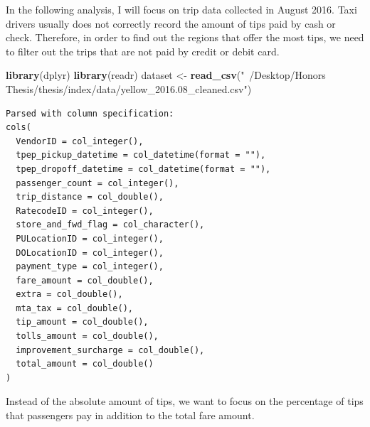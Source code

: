 \documentclass[12pt,twoside]{reedthesis}
\newenvironment{Shaded}{\begin{snugshade}}{\end{snugshade}}
\newcommand{\KeywordTok}[1]{\textcolor[rgb]{0.13,0.29,0.53}{\textbf{#1}}}
\newcommand{\DataTypeTok}[1]{\textcolor[rgb]{0.13,0.29,0.53}{#1}}
\newcommand{\DecValTok}[1]{\textcolor[rgb]{0.00,0.00,0.81}{#1}}
\newcommand{\FloatTok}[1]{\textcolor[rgb]{0.00,0.00,0.81}{#1}}
\newcommand{\StringTok}[1]{\textcolor[rgb]{0.31,0.60,0.02}{#1}}
\newcommand{\OperatorTok}[1]{\textcolor[rgb]{0.81,0.36,0.00}{\textbf{#1}}}
\newcommand{\NormalTok}[1]{#1}
\theoremstyle{definition}
\theoremstyle{definition}
\theoremstyle{definition}
\theoremstyle{remark}
\begin{document}
In the following analysis, I will focus on trip data collected in August
2016. Taxi drivers usually does not correctly record the amount of tips
paid by cash or check. Therefore, in order to find out the regions that
offer the most tips, we need to filter out the trips that are not paid
by credit or debit card.
\begin{Shaded}
\begin{Highlighting}[]
\KeywordTok{library}\NormalTok{(dplyr)}
\KeywordTok{library}\NormalTok{(readr)}
\NormalTok{dataset <-}\StringTok{ }\KeywordTok{read_csv}\NormalTok{(}\StringTok{"~/Desktop/Honors Thesis/thesis/index/data/yellow_2016.08_cleaned.csv"}\NormalTok{)}
\end{Highlighting}
\end{Shaded}
\begin{verbatim}
Parsed with column specification:
cols(
  VendorID = col_integer(),
  tpep_pickup_datetime = col_datetime(format = ""),
  tpep_dropoff_datetime = col_datetime(format = ""),
  passenger_count = col_integer(),
  trip_distance = col_double(),
  RatecodeID = col_integer(),
  store_and_fwd_flag = col_character(),
  PULocationID = col_integer(),
  DOLocationID = col_integer(),
  payment_type = col_integer(),
  fare_amount = col_double(),
  extra = col_double(),
  mta_tax = col_double(),
  tip_amount = col_double(),
  tolls_amount = col_double(),
  improvement_surcharge = col_double(),
  total_amount = col_double()
)
\end{verbatim}
\begin{Shaded}
\end{Shaded}
Instead of the absolute amount of tips, we want to focus on the
percentage of tips that passengers pay in addition to the total fare
amount.
\begin{Shaded}
\end{Shaded}
\end{document}
